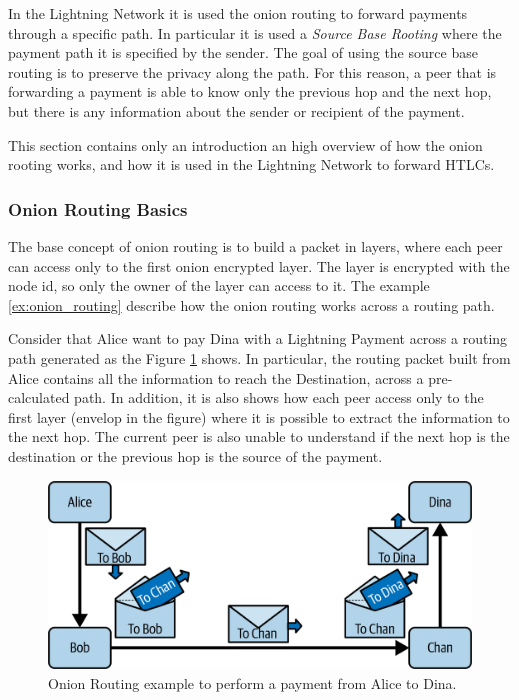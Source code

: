 In the Lightning Network it is used the onion routing to forward payments through a specific path.
In particular it is used a \emph{Source Base Rooting} where the payment path it is specified by the sender.
The goal of using the source base routing is to preserve the privacy along the path. For this reason, a peer that
is forwarding a payment is able to know only the previous hop and the next hop, but there is any information
about the sender or recipient of the payment.

This section contains only an introduction an high overview of how the onion rooting works,
and how it is used in the Lightning Network to forward HTLCs.

\subsubsection{Onion Routing Basics}

The base concept of onion routing is to build a packet in layers, where each peer can access only to the
first onion encrypted layer. The layer is encrypted with the node id, so only the owner of the layer can access to it.
The example \ref{ex:onion_routing} describe how the onion routing works across a routing path.

\begin{example}
  \label{ex:onion_routing}
  Consider that Alice want to pay Dina with a Lightning Payment across a routing path generated as the Figure \ref{fig:routing_path} shows.
  In particular, the routing packet built from Alice contains all the
  information to reach the Destination, across a pre-calculated path.
  In addition, it is also shows how each peer access only to the first layer (envelop in the figure) where it is possible to extract the information to the next hop.
  The current peer is also unable to understand if the next hop is the destination or the previous hop is the source of the payment.

  \begin{figure}[h]
    \begin{center}
      \includegraphics[width=0.6\columnwidth]{imgs/mtln_1007.png}
    \end{center}
    \caption{Onion Routing example to perform a payment from Alice to Dina.}
    \label{fig:routing_path}
  \end{figure}
\end{example}

